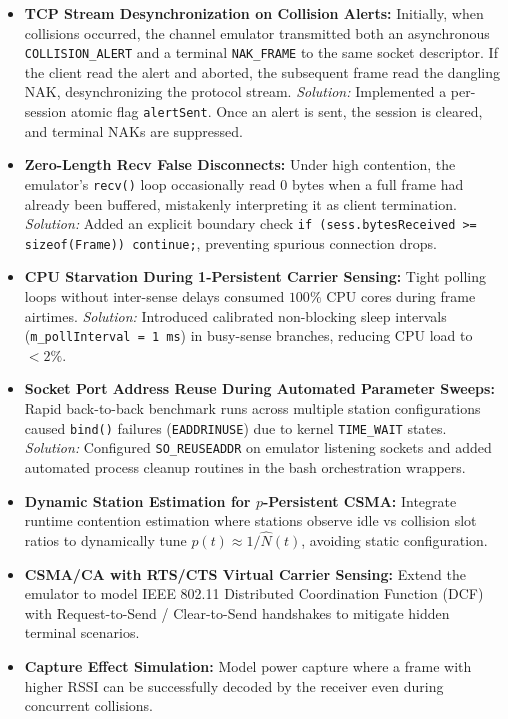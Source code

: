 \documentclass[11pt,a4paper]{article}
\begin{document}
\begin{commentbox}
\begin{itemize}[leftmargin=1.2em]
    \item \textbf{TCP Stream Desynchronization on Collision Alerts:} Initially, when collisions occurred, the channel emulator transmitted both an asynchronous \texttt{COLLISION\_ALERT} and a terminal \texttt{NAK\_FRAME} to the same socket descriptor. If the client read the alert and aborted, the subsequent frame read the dangling NAK, desynchronizing the protocol stream. 
    \textit{Solution:} Implemented a per-session atomic flag \texttt{alertSent}. Once an alert is sent, the session is cleared, and terminal NAKs are suppressed.
    \item \textbf{Zero-Length Recv False Disconnects:} Under high contention, the emulator's \texttt{recv()} loop occasionally read $0$ bytes when a full frame had already been buffered, mistakenly interpreting it as client termination.
    \textit{Solution:} Added an explicit boundary check \texttt{if (sess.bytesReceived >= sizeof(Frame)) continue;}, preventing spurious connection drops.
    \item \textbf{CPU Starvation During 1-Persistent Carrier Sensing:} Tight polling loops without inter-sense delays consumed $100\%$ CPU cores during frame airtimes.
    \textit{Solution:} Introduced calibrated non-blocking sleep intervals (\texttt{m\_pollInterval = 1 ms}) in busy-sense branches, reducing CPU load to $<2\%$.
    \item \textbf{Socket Port Address Reuse During Automated Parameter Sweeps:} Rapid back-to-back benchmark runs across multiple station configurations caused \texttt{bind()} failures (\texttt{EADDRINUSE}) due to kernel \texttt{TIME\_WAIT} states.
    \textit{Solution:} Configured \texttt{SO\_REUSEADDR} on emulator listening sockets and added automated process cleanup routines in the bash orchestration wrappers.
\end{itemize}
\end{commentbox}

\begin{commentbox}
\begin{itemize}[leftmargin=1.2em]
    \item \textbf{Dynamic Station Estimation for $p$-Persistent CSMA:} Integrate runtime contention estimation where stations observe idle vs collision slot ratios to dynamically tune $p(t) \approx 1/\hat{N}(t)$, avoiding static configuration.
    \item \textbf{CSMA/CA with RTS/CTS Virtual Carrier Sensing:} Extend the emulator to model IEEE 802.11 Distributed Coordination Function (DCF) with Request-to-Send / Clear-to-Send handshakes to mitigate hidden terminal scenarios.
    \item \textbf{Capture Effect Simulation:} Model power capture where a frame with higher RSSI can be successfully decoded by the receiver even during concurrent collisions.
\end{itemize}
\end{commentbox}
\end{document}
